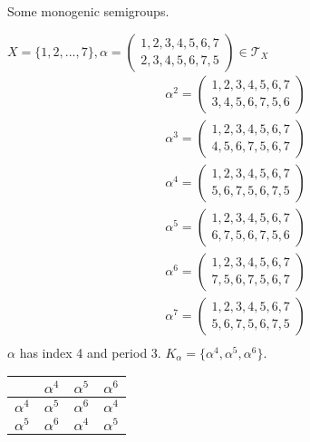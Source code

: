 \begin{Exap}Some monogenic semigroups.
    
    $X=\{1,2,...,7\},\alpha = (\begin{matrix}
        1,2,3,4,5,6,7   \\
        2,3,4,5,6,7,5
    \end{matrix}) \in \mathcal{T}_X$
    \begin{align*}
        \alpha^2=(\begin{matrix}
            1,2,3,4,5,6,7   \\
            3,4,5,6,7,5,6
        \end{matrix})   \\
        \alpha^3=(\begin{matrix}
            1,2,3,4,5,6,7   \\
            4,5,6,7,5,6,7
        \end{matrix})   \\
        \alpha^4=(\begin{matrix}
            1,2,3,4,5,6,7   \\
            5,6,7,5,6,7,5
        \end{matrix})   \\
        \alpha^5=(\begin{matrix}
            1,2,3,4,5,6,7   \\
            6,7,5,6,7,5,6
        \end{matrix})   \\
        \alpha^6=(\begin{matrix}
            1,2,3,4,5,6,7   \\
            7,5,6,7,5,6,7
        \end{matrix})   \\
        \alpha^7=(\begin{matrix}
            1,2,3,4,5,6,7   \\
            5,6,7,5,6,7,5
        \end{matrix})   \\
    \end{align*}
    $\alpha$ has index 4 and period 3. $K_\alpha = \{\alpha^4, \alpha^5, \alpha^6\}$.
    \begin{center}
        \begin{tabular}{c|ccc}
                       & $\alpha^4$ & $\alpha^5$ & $\alpha^6$ \\   \hline
            $\alpha^4$ & $\alpha^5$ & $\alpha^6$ & $\alpha^4$ \\  
            $\alpha^5$ & $\alpha^6$ & $\alpha^4$ & $\alpha^5$ \\

\end{tabular}
\end{center}
\end{Exap}
